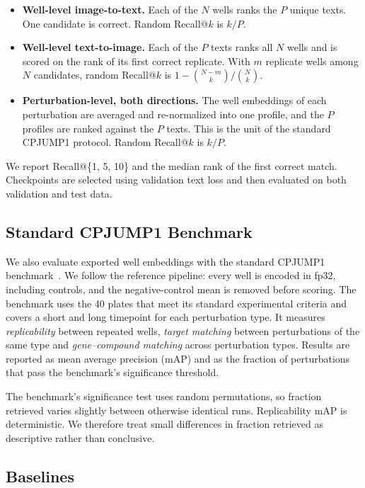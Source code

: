 \begin{itemize}
  \item \textbf{Well-level image-to-text.}
        Each of the $N$ wells ranks the $P$ unique texts. One candidate is correct. Random
        Recall@$k$
        is $k/P$.
  \item \textbf{Well-level text-to-image.}
        Each of the $P$ texts ranks all $N$ wells and is scored on the rank of its first correct
        replicate. With $m$ replicate wells among $N$ candidates, random Recall@$k$ is
        $1 - \binom{N-m}{k} / \binom{N}{k}$.
  \item \textbf{Perturbation-level, both directions.}
        The well embeddings of each perturbation are averaged and re-normalized into one profile,
        and the $P$ profiles are ranked against the $P$ texts. This is the unit of the standard
        CPJUMP1 protocol. Random Recall@$k$ is $k/P$.
\end{itemize}
We report Recall@\{1, 5, 10\} and the median rank of the first correct match. Checkpoints are
selected using validation text loss and then evaluated on both validation and test data.

\subsection{Standard CPJUMP1 Benchmark}

We also evaluate exported well embeddings with the standard CPJUMP1
benchmark~\cite{chandrasekaran2024jump}. We follow the reference pipeline: every well is encoded in fp32,
including controls, and the negative-control mean is removed before scoring. The benchmark uses the
40 plates that meet its standard experimental criteria and covers a short and long timepoint for
each perturbation type. It measures \emph{replicability} between repeated wells, \emph{target
  matching} between perturbations of the same type and \emph{gene--compound matching} across
perturbation types. Results are reported as mean average precision (mAP) and as the fraction of
perturbations that pass the benchmark's significance threshold.

The benchmark's significance test uses random permutations, so fraction retrieved varies slightly
between otherwise identical runs. Replicability mAP is deterministic. We therefore treat small
differences in fraction retrieved as descriptive rather than conclusive.

\subsection{Baselines}

